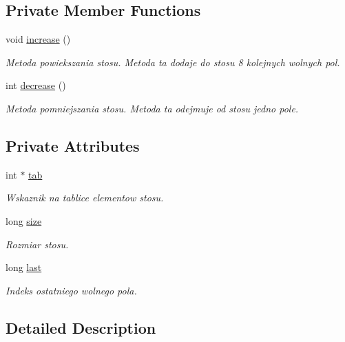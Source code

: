 \subsection*{Private Member Functions}
\begin{DoxyCompactItemize}
\item 
void \hyperlink{class_stos_aaf6e4717d1983c5351c9f5e9797368d3}{increase} ()
\begin{DoxyCompactList}\small\item\em Metoda powiekszania stosu. Metoda ta dodaje do stosu 8 kolejnych wolnych pol. \end{DoxyCompactList}\item 
int \hyperlink{class_stos_a1054dda0231b2516b6a04298801c0b27}{decrease} ()
\begin{DoxyCompactList}\small\item\em Metoda pomniejszania stosu. Metoda ta odejmuje od stosu jedno pole. \end{DoxyCompactList}\end{DoxyCompactItemize}
\subsection*{Private Attributes}
\begin{DoxyCompactItemize}
\item 
int $\ast$ \hyperlink{class_stos_abcb666dd5a69fe50228595dc8ac4160a}{tab}
\begin{DoxyCompactList}\small\item\em Wskaznik na tablice elementow stosu. \end{DoxyCompactList}\item 
long \hyperlink{class_stos_a07ba18a24f8f0dbd9144406d15bcd342}{size}
\begin{DoxyCompactList}\small\item\em Rozmiar stosu. \end{DoxyCompactList}\item 
long \hyperlink{class_stos_ae0623cdf9b6725e38da86b74972d61ba}{last}
\begin{DoxyCompactList}\small\item\em Indeks ostatniego wolnego pola. \end{DoxyCompactList}\end{DoxyCompactItemize}


\subsection{Detailed Description}


